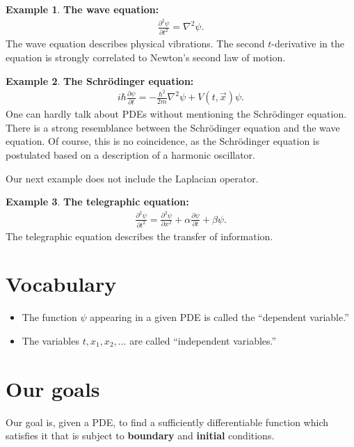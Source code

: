 \documentclass{book}
\theoremstyle{definition}
\newtheorem{exmp}{Example}[section]
\begin{document}
\begin{exmp}
	\textbf{The wave equation:}
	\begin{align*}
	\frac{\partial^2 \psi}{\partial t^2} = \nabla^2 \psi.
	\end{align*}
	The wave equation describes physical vibrations. The second $t$-derivative in the equation is strongly correlated to Newton's second law of motion.
\end{exmp}

\begin{exmp}
	\textbf{The Schr\"{o}dinger equation:}
	\begin{align*}
	i\hbar \frac{\partial \psi}{\partial t} = -\frac{\hbar^2}{2m}\nabla^2\psi + V(t,\vec{x})\psi.
	\end{align*}
	One can hardly talk about PDEs without mentioning the Schr\"{o}dinger equation. There is a strong resemblance between the Schr\"{o}dinger equation and the wave equation. Of course, this is no coincidence, as the Schr\"{o}dinger equation is postulated based on a description of a harmonic oscillator.  
\end{exmp}

Our next example does not include the Laplacian operator. 

\begin{exmp}
	\textbf{The telegraphic equation:}
	\begin{align*}
	\frac{\partial^2 \psi}{\partial t^2} = \frac{\partial^2 \psi}{\partial x^2} + \alpha \frac{\partial \psi}{\partial t} + \beta \psi.
	\end{align*}
	The telegraphic equation describes the transfer of information. 
\end{exmp}

\section{Vocabulary}
\begin{itemize}
	\item The function $\psi$ appearing in a given PDE is called the ``dependent variable.''
	\item The variables $t,x_1,x_2,\dots$ are called ``independent variables.''
\end{itemize}

\section{Our goals}
Our goal is, given a PDE, to find a sufficiently differentiable function which satisfies it that is subject to \textbf{boundary} and \textbf{initial} conditions. 
\end{document}
